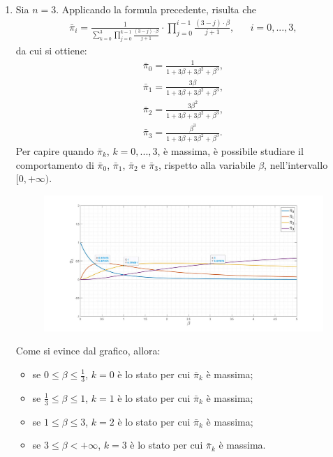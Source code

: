 \documentclass[11pt,largemargins]{homework}
\begin{document}
\begin{enumerate}
\item
Sia $n=3$. Applicando la formula precedente, risulta che
\begin{align*}
\bar{\pi}_{i}=\frac{1}{\sum_{k=0}^{3}\prod_{j=0}^{k-1}\frac{\left(3-j\right)\cdot\beta}{j+1}}\cdot\prod_{j=0}^{i-1}\frac{\left(3-j\right)\cdot\beta}{j+1},&&i=0,...,3,
\end{align*}
da cui si ottiene:
\begin{align*}
\bar{\pi}_{0}=\frac{1}{1+3\beta+3\beta^{2}+\beta^{3}},\\
\bar{\pi}_{1}=\frac{3\beta}{1+3\beta+3\beta^{2}+\beta^{3}},\\
\bar{\pi}_{2}=\frac{3\beta^{2}}{1+3\beta+3\beta^{2}+\beta^{3}},\\
\bar{\pi}_{3}=\frac{\beta^{3}}{1+3\beta+3\beta^{2}+\beta^{3}}.
  \end{align*}
  Per capire quando $\bar{\pi}_{k}$, $k=0,...,3$, è massima, è possibile studiare il comportamento di $\bar{\pi}_{0}$, $\bar{\pi}_{1}$, $\bar{\pi}_{2}$ e $\bar{\pi}_{3}$, rispetto alla variabile $\beta$, nell'intervallo $[0,+\infty)$.
  
  \begin{figure}[htb]\centering
\includegraphics[scale=0.26]{ex1_3plot.jpg}
  \end{figure}
  \newpage
  Come si evince dal grafico, allora:
  \begin{itemize}
  \item
  se  $0\leq\beta\leq\frac{1}{3}$,  $k=0$ è lo stato per cui $\bar{\pi}_{k}$ è massima;
  \item
  se  $\frac{1}{3}\leq\beta\leq 1$,  $k=1$ è lo stato per cui $\bar{\pi}_{k}$ è massima;
  \item
  se  $1\leq\beta\leq 3$,  $k=2$ è lo stato per cui $\bar{\pi}_{k}$ è massima;
  \item
  se  $3\leq\beta< +\infty$,  $k=3$ è lo stato per cui $\bar{\pi}_{k}$ è massima.
  \end{itemize}
 

\end{enumerate}
\end{document}
